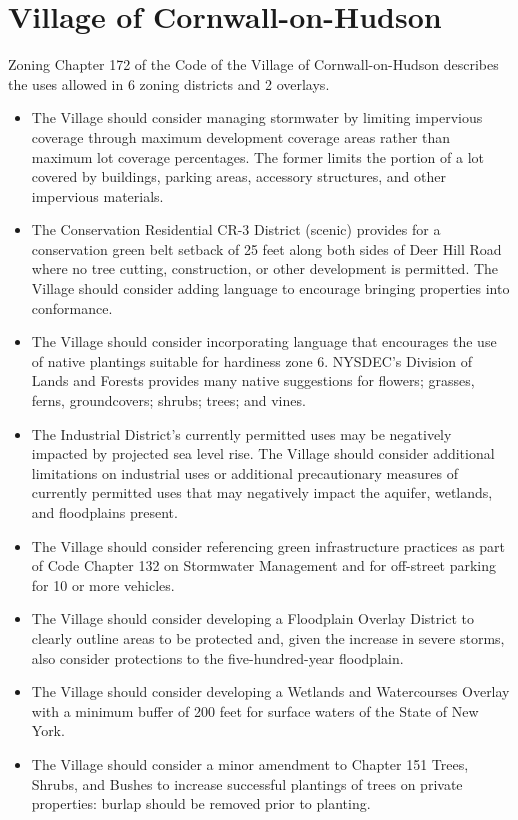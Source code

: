 \section{Village of Cornwall-on-Hudson}
Zoning Chapter 172 of the Code of the Village of Cornwall-on-Hudson describes 
the uses allowed in 6 zoning districts and 2 overlays.
\begin{itemize}
    \item The Village should consider managing stormwater by limiting 
    impervious coverage through maximum development coverage areas rather than 
    maximum lot coverage percentages. The former limits the portion of a lot 
    covered by buildings, parking areas, accessory structures, and other 
    impervious materials.
    \item The Conservation Residential CR-3 District (scenic) provides for a 
    conservation green belt setback of 25 feet along both sides of Deer Hill 
    Road where no tree cutting, construction, or other development is 
    permitted. The Village should consider adding language to encourage 
    bringing properties into conformance.
    \item The Village should consider incorporating language that encourages the 
    use of native plantings suitable for hardiness zone 6. NYSDEC’s Division of 
    Lands and Forests provides many native suggestions for flowers; grasses, 
    ferns, groundcovers; shrubs; trees; and vines.
    \item The Industrial District’s currently permitted uses may be negatively 
    impacted by projected sea level rise. The Village should consider 
    additional limitations on industrial uses or additional precautionary 
    measures of currently permitted uses that may negatively impact the 
    aquifer, wetlands, and floodplains present.
    \item The Village should consider referencing green infrastructure 
    practices as part of Code Chapter 132 on Stormwater Management and for 
    off-street parking for 10 or more vehicles.
    \item The Village should consider developing a Floodplain Overlay District 
    to clearly outline areas to be protected and, given the increase in severe 
    storms, also consider protections to the five-hundred-year floodplain.
    \item The Village should consider developing a Wetlands and Watercourses 
    Overlay with a minimum buffer of 200 feet for surface waters of the State of 
    New York.
    \item The Village should consider a minor amendment to Chapter 151 Trees, 
    Shrubs, and Bushes to increase successful plantings of trees on private 
    properties: burlap should be removed prior to planting.
\end{itemize}
\label{map:villagezoning}